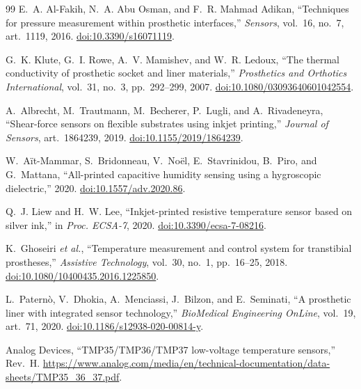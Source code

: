 \documentclass[10pt,twocolumn]{article}
\begin{document}
\begin{thebibliography}{99}
\small
{}
E.~A. Al-Fakih, N.~A. Abu Osman, and F.~R. Mahmad Adikan,
``Techniques for pressure measurement within prosthetic interfaces,''
\textit{Sensors}, vol.~16, no.~7, art.~1119, 2016.
\href{https://doi.org/10.3390/s16071119}{doi:10.3390/s16071119}.

G.~K. Klute, G.~I. Rowe, A.~V. Mamishev, and W.~R. Ledoux,
``The thermal conductivity of prosthetic socket and liner materials,''
\textit{Prosthetics and Orthotics International}, vol.~31, no.~3,
pp.~292--299, 2007.
\href{https://doi.org/10.1080/03093640601042554}
{doi:10.1080/03093640601042554}.

A.~Albrecht, M.~Trautmann, M.~Becherer, P.~Lugli, and A.~Rivadeneyra,
``Shear-force sensors on flexible substrates using inkjet printing,''
\textit{Journal of Sensors}, art.~1864239, 2019.
\href{https://doi.org/10.1155/2019/1864239}
{doi:10.1155/2019/1864239}.

W.~Aït-Mammar, S.~Bridonneau, V.~Noël, E.~Stavrinidou, B.~Piro,
and G.~Mattana,
``All-printed capacitive humidity sensing using a hygroscopic dielectric,''
2020.
\href{https://doi.org/10.1557/adv.2020.86}
{doi:10.1557/adv.2020.86}.

Q.~J. Liew and H.~W. Lee,
``Inkjet-printed resistive temperature sensor based on silver ink,''
in \textit{Proc. ECSA-7}, 2020.
\href{https://doi.org/10.3390/ecsa-7-08216}
{doi:10.3390/ecsa-7-08216}.

K.~Ghoseiri \textit{et al.},
``Temperature measurement and control system for transtibial prostheses,''
\textit{Assistive Technology}, vol.~30, no.~1, pp.~16--25, 2018.
\href{https://doi.org/10.1080/10400435.2016.1225850}
{doi:10.1080/10400435.2016.1225850}.

L.~Paternò, V.~Dhokia, A.~Menciassi, J.~Bilzon, and E.~Seminati,
``A prosthetic liner with integrated sensor technology,''
\textit{BioMedical Engineering OnLine}, vol.~19, art.~71, 2020.
\href{https://doi.org/10.1186/s12938-020-00814-y}
{doi:10.1186/s12938-020-00814-y}.

Analog Devices,
``TMP35/TMP36/TMP37 low-voltage temperature sensors,'' Rev.~H.
\url{https://www.analog.com/media/en/technical-documentation/data-sheets/TMP35_36_37.pdf}.
\end{thebibliography}
\end{document}
